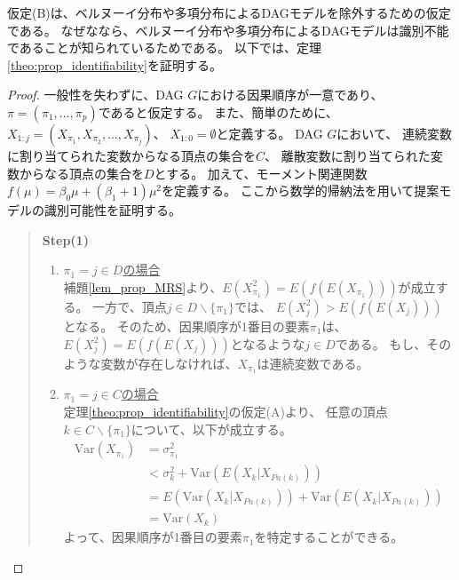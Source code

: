 仮定(B)は、ベルヌーイ分布や多項分布によるDAGモデルを除外するための仮定である。
なぜななら、ベルヌーイ分布や多項分布によるDAGモデルは識別不能であることが知られているためである\cite{Heckerman1995-es}。
以下では、定理\ref{theo:prop_identifiability}を証明する。

\begin{proof}
  一般性を失わずに、DAG $G$における因果順序が一意であり、$\pi = (\pi_1, \dots, \pi_p)$であると仮定する。
  また、簡単のために、$X_{1:j} = (X_{\pi_1}, X_{\pi_2}, \dots, X_{\pi_j})$、
  $X_{1:0} = \emptyset$と定義する。
  DAG $G$において、
  連続変数に割り当てられた変数からなる頂点の集合を$C$、
  離散変数に割り当てられた変数からなる頂点の集合を$D$とする。
  加えて、モーメント関連関数$f(\mu) = \beta_0 \mu + (\beta_1 + 1)\mu^2$を定義する。
  ここから数学的帰納法を用いて提案モデルの識別可能性を証明する。

  \begin{quote}
    \textbf{Step(1)}
    \begin{enumerate}[label=(\roman*)]
      \item
      \underline{$\pi_1 = j \in D$の場合} \\
      補題\ref{lem_prop_MRS}より、$E(X_{\pi_1}^2) = E(f(E(X_{\pi_1})))$が成立する。
      一方で、頂点$j \in D \backslash \{\pi_1\}$では、
      $E(X_j^2) > E(f(E(X_j)))$となる。
      そのため、因果順序が1番目の要素$\pi_1$は、
      $E(X_j^2) = E(f(E(X_j)))$となるような$j \in D$である。
      もし、そのような変数が存在しなければ、$X_{\pi_1}$は連続変数である。

      \item
      \underline{$\pi_1 = j \in C$の場合}\\
      定理\ref{theo:prop_identifiability}の仮定(A)より、
      任意の頂点$k \in C \backslash \{\pi_1\}$について、以下が成立する。
      \begin{align*}
        \mathrm{Var}(X_{\pi_1}) &= \sigma_{\pi_1}^2 \\
                                &< \sigma_k^2 + \mathrm{Var}(E(X_k | X_{Pa(k)})) \\
                                &= E(\mathrm{Var}(X_k | X_{Pa(k)})) + \mathrm{Var}(E(X_k | X_{Pa(k)})) \\
                                &= \mathrm{Var}(X_k)
      \end{align*}
      よって、因果順序が1番目の要素$\pi_1$を特定することができる。
    \end{enumerate}
  \end{quote}


\end{proof}
